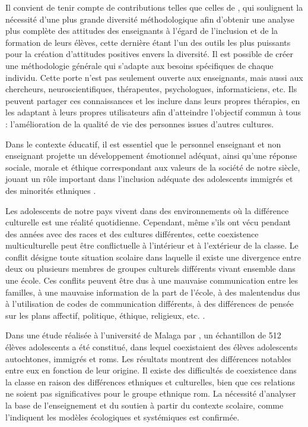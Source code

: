 \documentclass[french]{textolivre}
\begin{document}
Il convient de tenir compte de contributions telles que celles de \textcite{lacruz-perez_teachers_2021}, qui soulignent la nécessité d'une plus grande diversité méthodologique afin d'obtenir une analyse plus complète des attitudes des enseignants à l'égard de l'inclusion et de la formation de leurs élèves, cette dernière étant l'un des outils les plus puissants pour la création d'attitudes positives envers la diversité. Il est possible de créer une méthodologie générale qui s'adapte aux besoins spécifiques de chaque individu. Cette porte n'est pas seulement ouverte aux enseignants, mais aussi aux chercheurs, neuroscientifiques, thérapeutes, psychologues, informaticiens, etc. Ils peuvent partager ces connaissances et les inclure dans leurs propres thérapies, en les adaptant à leurs propres utilisateurs afin d'atteindre l'objectif commun à tous : l'amélioration de la qualité de vie des personnes issues d'autres cultures.

Dans le contexte éducatif, il est essentiel que le personnel enseignant et non enseignant projette un développement émotionnel adéquat, ainsi qu'une réponse sociale, morale et éthique correspondant aux valeurs de la société de notre siècle, jouant un rôle important dans l'inclusion adéquate des adolescents immigrés et des minorités ethniques \cite{crockett_acculturative_2007}.

Les adolescents de notre pays vivent dans des environnements où la différence culturelle est une réalité quotidienne. Cependant, même s'ils ont vécu pendant des années avec des races et des cultures différentes, cette coexistence multiculturelle peut être conflictuelle à l'intérieur et à l'extérieur de la classe. Le conflit désigne toute situation scolaire dans laquelle il existe une divergence entre deux ou plusieurs membres de groupes culturels différents vivant ensemble dans une école. Ces conflits peuvent être dus à une mauvaise communication entre les familles, à une mauvaise information de la part de l'école, à des malentendus dus à l'utilisation de codes de communication différents, à des différences de pensée sur les plans affectif, politique, éthique, religieux, etc. \cite{leiva_olivencia_conflictos_2007}.

Dans une étude réalisée à l'université de Malaga par \textcite{hombrados-mendieta_apoyo_2013}, un échantillon de 512 élèves adolescents a été constitué, dans lequel coexistaient des élèves adolescents autochtones, immigrés et roms. Les résultats montrent des différences notables entre eux en fonction de leur origine. Il existe des difficultés de coexistence dans la classe en raison des différences ethniques et culturelles, bien que ces relations ne soient pas significatives pour le groupe ethnique rom. La nécessité d'analyser la base de l'enseignement et du soutien à partir du contexte scolaire, comme l'indiquent les modèles écologiques et systémiques est confirmée.
\end{document}
